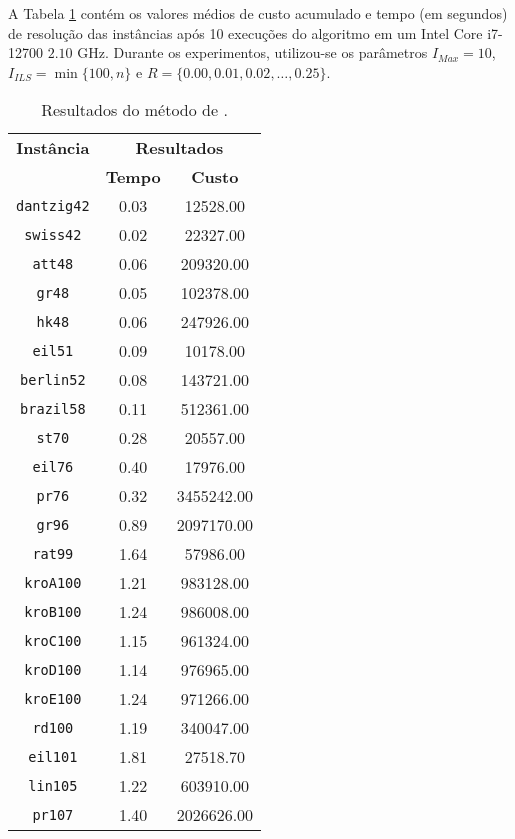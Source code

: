 A Tabela \ref{tab:mlpResults} contém os valores médios de custo acumulado e tempo (em segundos) de resolução das instâncias após 10 execuções do algoritmo em um Intel{\textregistered} Core{\texttrademark} i7-12700 $2.10$ GHz. Durante os experimentos, utilizou-se os parâmetros $I_{Max} = 10$, $I_{ILS} = \min\{100,n\}$ e $R = \{0.00, 0.01, 0.02,\dots,0.25\}$.
 \begin{table}[!ht]
 \centering
 \caption{Resultados do método de \cite{SILVA2012513}.}
 \footnotesize
 \begin{tabular}{ccc}
 \toprule
\multirow{2.5}{*}{\textbf{Instância}} & \multicolumn{2}{c}{\textbf{Resultados}} \\
\cmidrule{2-3} & \textbf{Tempo} & \textbf{Custo} \\
\midrule
  \texttt{dantzig42}   & 0.03 & 12528.00 \\ 
  \texttt{swiss42}   & 0.02 & 22327.00 \\ 
  \texttt{att48}   & 0.06 & 209320.00 \\ 
  \texttt{gr48}   & 0.05 & 102378.00 \\ 
  \texttt{hk48}   & 0.06 & 247926.00 \\ 
  \texttt{eil51}   & 0.09 & 10178.00 \\ 
  \texttt{berlin52}   & 0.08 & 143721.00 \\ 
  \texttt{brazil58}   & 0.11 & 512361.00 \\ 
  \texttt{st70}   & 0.28 & 20557.00 \\ 
  \texttt{eil76}   & 0.40 & 17976.00 \\ 
  \texttt{pr76}   & 0.32 & 3455242.00 \\ 
  \texttt{gr96}   & 0.89 & 2097170.00 \\ 
  \texttt{rat99}   & 1.64 & {57986.00} \\ 
  \texttt{kroA100}   & 1.21 & 983128.00 \\ 
  \texttt{kroB100}   & 1.24 & 986008.00 \\ 
  \texttt{kroC100}   & 1.15 & 961324.00 \\ 
  \texttt{kroD100}   & 1.14 & 976965.00 \\ 
  \texttt{kroE100}   & 1.24 & 971266.00 \\ 
  \texttt{rd100}   & 1.19 & 340047.00 \\ 
  \texttt{eil101}   & 1.81 & {27518.70} \\ 
  \texttt{lin105}   & 1.22 & 603910.00 \\ 
  \texttt{pr107}   & 1.40 & 2026626.00 \\ 
\bottomrule
 \end{tabular}
 \label{tab:mlpResults}
 \end{table}
 
